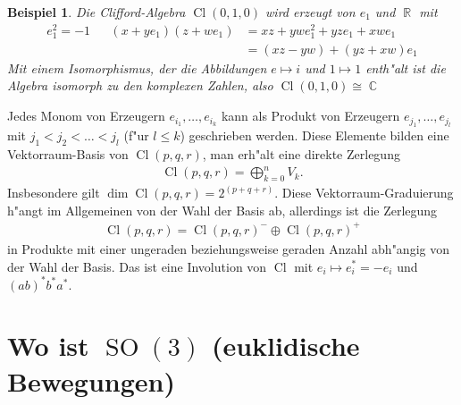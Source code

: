\documentclass[paper=A4, twoside, chapterprefix=true, bibliography=totoc, headsepline]{scrbook}
\DeclareMathOperator{\C}{\mathbb{C}}
\DeclareMathOperator{\R}{\mathbb{R}}
\DeclareMathOperator{\Cl}{Cl}
\DeclareMathOperator{\SO}{SO} %
\theoremstyle{nonumberbreak}
\newtheorem{bsp}{Beispiel}
\theoremstyle{emptybreak}
\theoremstyle{break}
\begin{document}
\begin{bsp}
Die Clifford-Algebra $\Cl(0, 1, 0)$ wird erzeugt von $e_1$ und $\R$ mit
\begin{align*}
	e_1^2 = -1 && (x + y e_1) (z + w e_1) &= xz + yw e_1^2 + yz e_1 + xw e_1 \\
	&&&= (xz - yw) + (yz + xw) e_1
\end{align*}
Mit einem Isomorphismus, der die Abbildungen $e \mapsto i$ und $1 \mapsto 1$ enth"alt ist die Algebra isomorph zu den komplexen Zahlen, also $\Cl(0, 1, 0) \cong \C$
\end{bsp}

Jedes Monom von Erzeugern  $e_{i_1}, \ldots, e_{i_k}$ kann als Produkt von Erzeugern $e_{j_1}, \ldots, e_{j_l}$ mit $j_1 < j_2 < \ldots < j_l$ (f"ur $l \le k$) geschrieben werden.
Diese Elemente bilden eine Vektorraum-Basis von $\Cl(p, q, r)$, man erh"alt eine direkte Zerlegung
\begin{align*}
	\Cl(p, q, r) = \bigoplus_{k=0}^n V_k.
\end{align*}
Insbesondere gilt $\dim \Cl(p, q, r) = 2^{(p + q + r)}$.
Diese Vektorraum-Graduierung h"angt im Allgemeinen von der Wahl der Basis ab, allerdings ist die Zerlegung
\begin{align*}
	\Cl(p, q, r) = \Cl(p, q, r)^- \oplus \Cl(p, q, r)^+
\end{align*}
in Produkte mit einer ungeraden beziehungsweise geraden Anzahl abh"angig von der Wahl der Basis.
Das ist eine Involution von $\Cl$ mit $e_i \mapsto e_i^* = -e_i$ und $(ab)^*  b^* a^*$.

\section{Wo ist $\SO(3)$ (euklidische Bewegungen)}
\end{document}
